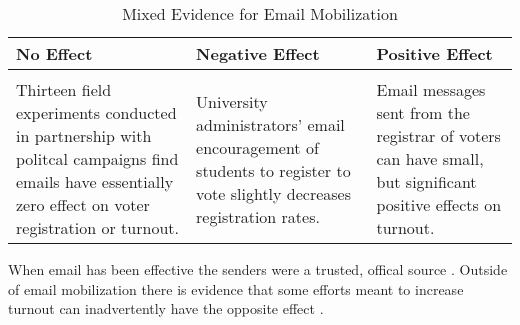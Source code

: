 \begin{table}[h]
  \caption{Mixed Evidence for Email
    Mobilization \label{tab:literature}}
  \footnotesize
  \begin{tabular}{p{}p{}p{}}
    \toprule
    \textbf{No Effect} & \textbf{Negative Effect} & \textbf{Positive Effect} \\
    \midrule
    \cite{nickerson2007} & \cite{bennion2011} & \cite{malhotra2012email} \\
    Thirteen field experiments conducted in partnership with politcal
    campaigns find emails have essentially zero effect on voter
    registration or turnout.
                       & University administrators' email
                         encouragement of students to register
                         to vote slightly decreases registration
                         rates.
                                                  & Email messages sent
                                                    from the registrar
                                                    of voters can have
                                                    small, but
                                                    significant
                                                    positive effects
                                                    on turnout.  \\ 
    \bottomrule
  \end{tabular}
  {\raggedright \footnotesize When email has been effective the senders were a trusted, offical
    source \citep{malhotra2012email}. Outside of email mobilization there is
    evidence that some efforts meant to increase turnout can
    inadvertently have the opposite effect \citep[e.g.][]{mccabe2015,
      kousser2007, grose2008, cornwall2012}.\par}
\end{table}

